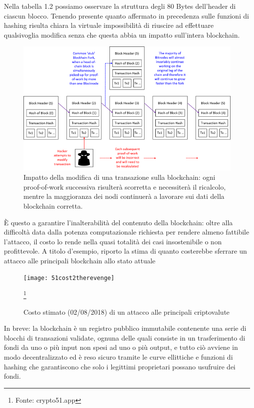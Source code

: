 Nella tabella 1.2 possiamo osservare la struttura degli 80 Bytes dell’header di ciascun blocco. Tenendo presente quanto affermato in precedenza sulle funzioni di hashing risulta chiara la virtuale impossibilità di riuscire ad effettuare qualsivoglia modifica senza che questa abbia un impatto sull’intera blockchain.

\begin{figure}
	\centering
	\includegraphics[width=1.0\linewidth]{images/blockchain-diagram}
	\caption{Impatto della modifica di una transazione sulla blockchain: ogni proof-of-work successiva risulterà scorretta e necessiterà il ricalcolo, mentre la maggioranza dei nodi continuerà a lavorare sui dati della blockchain corretta.}
	\label{fig:blockchain-diagram}
\end{figure}


È questo a garantire l’inalterabilità del contenuto della blockchain: oltre alla difficoltà data dalla potenza computazionale richiesta per rendere almeno fattibile l’attacco, il costo lo rende nella quasi totalità dei casi insostenibile o non profittevole.
A titolo d’esempio, riporto la stima di quanto costerebbe sferrare un attacco alle principali blockchain allo stato attuale

\begin{figure}[h]
\centering
\texttt{[image: 51cost2therevenge]}	
\caption{Costo stimato (02/08/2018) di un attacco alle principali criptovalute}
\label{fig:51cost2therevenge}
\footnote{Fonte: crypto51.app}
\end{figure}



In breve: la blockchain è un registro pubblico immutabile contenente una serie di blocchi di transazioni validate, ognuna delle quali consiste in un trasferimento di fondi da uno o più input non spesi ad uno o più output, e tutto ciò avviene in modo decentralizzato ed è reso sicuro tramite le curve ellittiche e funzioni di hashing che garantiscono che solo i legittimi proprietari possano usufruire dei fondi.



